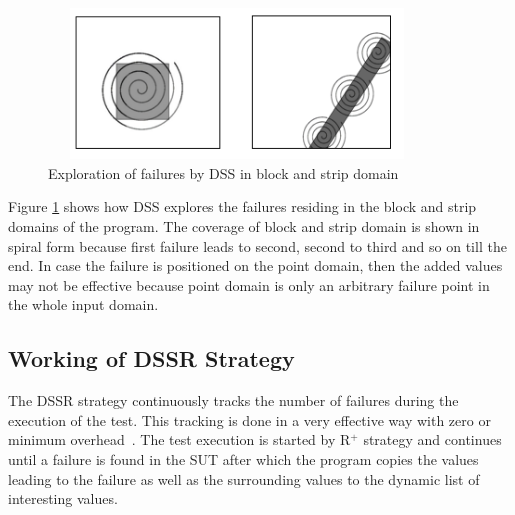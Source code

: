\bigskip
\bigskip
\begin{figure}[ht]
\centering
\includegraphics[width=10cm,height=4cm]{chapter4/block2.png}
\bigskip
\caption{Exploration of failures by DSS in block and strip domain}
\label{fig:block2}
\end{figure}
\bigskip
\bigskip

Figure \ref{fig:block2} shows how DSS explores the failures residing in the block and strip domains of the program. The coverage of block and strip domain is shown in spiral form because first failure leads to second, second to third and so on till the end. In case the failure is positioned on the point domain, then the added values may not be effective because point domain is only an arbitrary failure point in the whole input domain.

\subsection{Working of DSSR Strategy}

The DSSR strategy continuously tracks the number of failures during the execution of the test. This tracking is done in a very effective way with zero or minimum overhead~\cite{leitner2009effectiveness}. The test execution is started by R$^+$ strategy and continues until a failure is found in the SUT after which the program copies the values leading to the failure as well as the surrounding values to the dynamic list of interesting values. 

